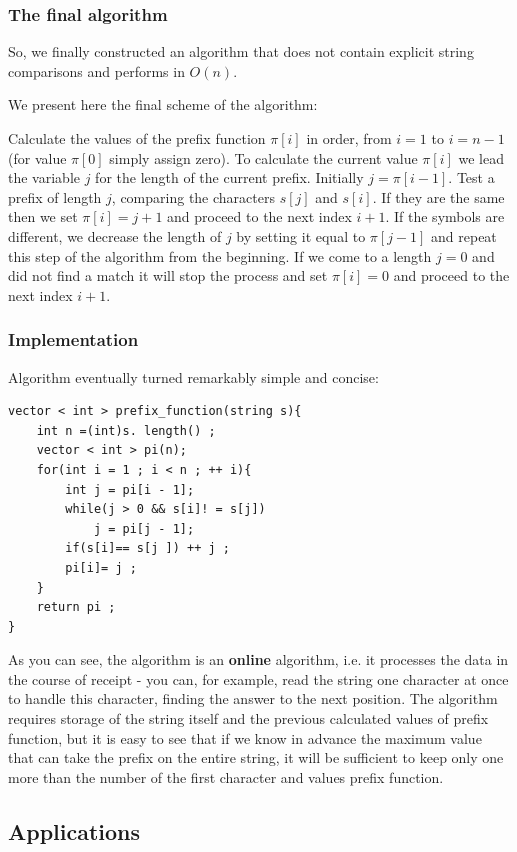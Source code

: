 \subsubsection{ The final algorithm }

So, we finally constructed an algorithm that does not contain explicit string comparisons and performs in $O (n)$.

We present here the final scheme of the algorithm:

Calculate the values ​​of the prefix function $\pi [i]$ in order, from $i = 1$ to $i = n-1$ (for value $\pi [0]$ simply assign zero).
To calculate the current value $\pi [i]$ we lead the variable $j$ for the length of the current prefix. Initially $j = \pi [i-1]$.
Test a prefix of length $j$, comparing the characters $s [j]$ and $s [i]$. If they are the same then we set $\pi [i] = j +1$ and proceed to the next index $i +1$. If the symbols are different, we decrease the length of $j$ by setting it equal to $\pi [j-1]$ and repeat this step of the algorithm from the beginning.
If we come to a length $j = 0$ and did not find a match it will stop the process and set $\pi [i] = 0$ and proceed to the next index $i +1$.
\subsubsection{ Implementation }

Algorithm eventually turned remarkably simple and concise:

\begin{verbatim}
vector < int > prefix_function(string s){
    int n =(int)s. length() ;
    vector < int > pi(n);
    for(int i = 1 ; i < n ; ++ i){
        int j = pi[i - 1];
        while(j > 0 && s[i]! = s[j])
            j = pi[j - 1];
        if(s[i]== s[j ]) ++ j ;
        pi[i]= j ;
    }
    return pi ;
} 
\end{verbatim}
As you can see, the algorithm is an \textbf{online} algorithm, i.e. it processes the data in the course of receipt - you can, for example, read the string one character at once to handle this character, finding the answer to the next position. The algorithm requires storage of the string itself and the previous calculated values of ​​prefix function, but it is easy to see that if we know in advance the maximum value that can take the prefix on the entire string, it will be sufficient to keep only one more than the number of the first character and values prefix function.

\subsection{ Applications }

